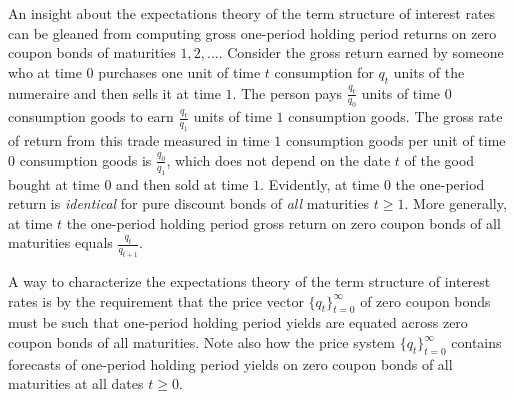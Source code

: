 


An insight about the expectations theory of the term structure of interest rates can be gleaned from computing  gross one-period holding period
 returns on zero coupon bonds of maturities $1, 2, \ldots$.  Consider the gross return earned by someone who at time $0$ purchases one unit of time $t$ consumption for  $q_t$ units
of the numeraire and  then sells it
at time $1$.  The person pays ${\frac{q_t}{q_0}}$ units of time $0$ consumption goods to earn ${\frac{q_t}{q_1}}$ units of time $1$
 consumption goods.  The gross rate of return from this trade  measured in time $1$ consumption goods per unit of time $0$ consumption goods
 is ${\frac{q_0}{q_1}}$, which does not depend on the date $t$ of the good bought at time $0$ and then sold at time $1$.
   Evidently,  at time $0$ the one-period return is {\it identical\/} for pure discount
bonds of {\it all\/} maturities $t \geq 1$.  More generally, at time $t$ the one-period holding period gross return on zero coupon bonds of all maturities
equals ${\frac{q_{t}}{q_{t+1}}}$.

A  way to characterize the expectations theory of the term structure of interest rates is by the requirement
that the price vector $\{q_t\}_{t=0}^\infty$ of zero coupon bonds must be such that one-period holding period yields are equated across zero coupon bonds of
all maturities.  Note also how the price system $\{q_t\}_{t=0}^\infty$ contains forecasts of one-period holding period yields on zero coupon bonds of all maturities
at all dates $t \geq 0$. %
%


